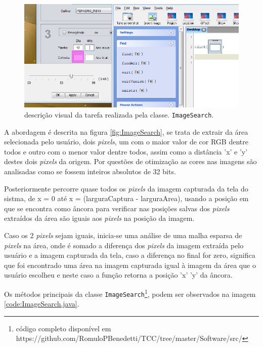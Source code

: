 \documentclass[tg]{mdtufsm}
\begin{document}
                    \begin{figure}[!htb]
                        {\centering
                        \includegraphics[width=1.0\textwidth]{imagens/a.png}
                        \caption{descrição visual da tarefa realizada pela classe. \texttt{ImageSearch}.}
                        \label{fig:sikulixNoMatch}}
                    \end{figure}

                    A abordagem é descrita na figura \ref{fig:ImageSearch}, se trata de extrair da área selecionada pelo usuário, dois \emph{pixels}, um com o maior valor de cor RGB dentre todos e outro com o menor valor dentre todos, assim como a distância 'x' e 'y' destes dois \emph{pixels} da origem. Por questões de otimização as cores nas imagens são analisadas como se fossem inteiros absolutos de 32 bits.

                    Posteriormente percorre quase todos os \emph{pixels} da imagem capturada da tela do sistma, de x = 0 até x = (larguraCaptura - larguraArea), usando a posição em que se encontra como âncora para verificar nas posições salvas dos \emph{pixels} extraídos da área são iguais aos \emph{pixels} na posição da imagem.

                    Caso os 2 \emph{pixels} sejam iguais, inicia-se uma análise de uma malha esparsa de \emph{pixels} na área, onde é somado a diferença dos \emph{pixels} da imagem extraída pelo usuário e a imagem capturada da tela, caso a diferença no final for zero, significa que foi encontrado uma área na imagem capturada igual à imagem da área que o usuário escolheu e neste caso a função retorna a posição 'x' 'y' da âncora.

                    Os métodos principais da classe \texttt{ImageSearch}\footnote{código completo disponível em https://github.com/RomuloPBenedetti/TCC/tree/master/Software/src/}, podem ser observados na imagem \ref{code:ImageSearch.java}.
\end{document}
